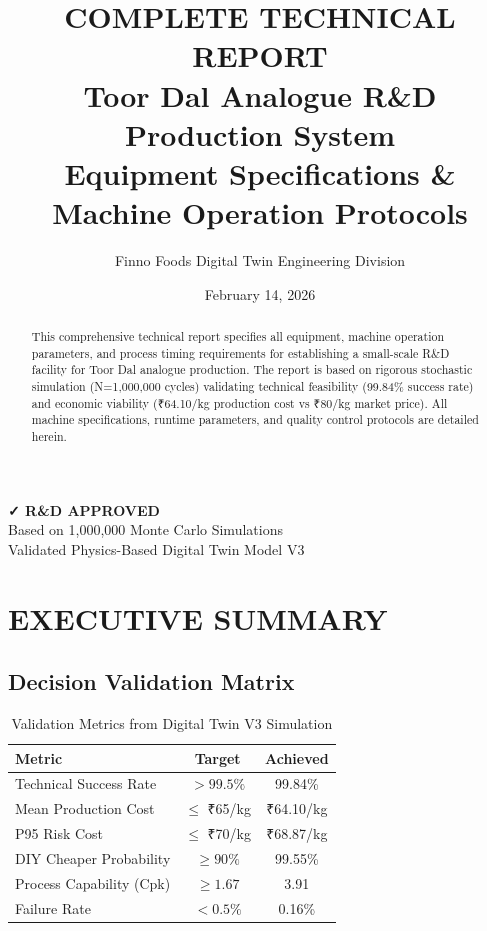 \documentclass[12pt,a4paper]{article}
\title{\textbf{COMPLETE TECHNICAL REPORT} \\
\Large Toor Dal Analogue R\&D Production System \\
\large Equipment Specifications \& Machine Operation Protocols}
\author{Finno Foods Digital Twin Engineering Division}
\date{February 14, 2026}
\begin{document}
\maketitle
\thispagestyle{empty}

\begin{center}
\Large \textcolor{approvedgreen}{\textbf{✓ R\&D APPROVED}}\\
\normalsize Based on 1,000,000 Monte Carlo Simulations\\
Validated Physics-Based Digital Twin Model V3
\end{center}

\vspace{1cm}

\begin{abstract}
This comprehensive technical report specifies all equipment, machine operation parameters, and process timing requirements for establishing a small-scale R\&D facility for Toor Dal analogue production. The report is based on rigorous stochastic simulation (N=1,000,000 cycles) validating technical feasibility (99.84\% success rate) and economic viability (₹64.10/kg production cost vs ₹80/kg market price). All machine specifications, runtime parameters, and quality control protocols are detailed herein.
\end{abstract}

\newpage
\tableofcontents
\newpage

\section{EXECUTIVE SUMMARY}

\subsection{Decision Validation Matrix}

\begin{table}[h]
\centering
\begin{tabular}{lcc}
\toprule
\textbf{Metric} & \textbf{Target} & \textbf{Achieved} \\
\midrule
Technical Success Rate & $>99.5\%$ & \textcolor{approvedgreen}{99.84\%} \\
Mean Production Cost & $\leq$ ₹65/kg & \textcolor{approvedgreen}{₹64.10/kg} \\
P95 Risk Cost & $\leq$ ₹70/kg & \textcolor{approvedgreen}{₹68.87/kg} \\
DIY Cheaper Probability & $\geq 90\%$ & \textcolor{approvedgreen}{99.55\%} \\
Process Capability (Cpk) & $\geq 1.67$ & \textcolor{approvedgreen}{3.91} \\
Failure Rate & $< 0.5\%$ & \textcolor{approvedgreen}{0.16\%} \\
\bottomrule
\end{tabular}
\caption{Validation Metrics from Digital Twin V3 Simulation}
\end{table}
\end{document}
